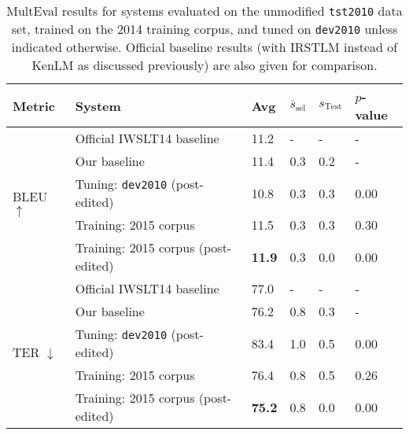 {%

















\begin{table}[htb]
\begin{center}
\begin{tabular}{|l|l|l|l|l|l|}
\hline
\bf Metric & \bf System & \bf Avg & \bf $\overline{s}_{\text{sel}}$ & \bf $s_{\text{Test}}$ & \bf $p$-value \\
\hline
\multirow{5}{*}{BLEU $\uparrow$}
& Official IWSLT14 baseline  & 11.2 & -   & -   & - \\
& Our baseline & 11.4 & 0.3 & 0.2 & - \\
& Tuning: {\small \tt dev2010} (post-edited) & 10.8 & 0.3 & 0.3 & 0.00 \\
& Training: 2015 corpus & 11.5 & 0.3 & 0.3 & 0.30 \\
& Training: 2015 corpus (post-edited) & \textbf{11.9} & 0.3 & 0.0 & 0.00 \\
\hline
\multirow{5}{*}{TER $\downarrow$}
& Official IWSLT14 baseline & 77.0 & -   & -   & - \\
& Our baseline & 76.2 & 0.8 & 0.3 & - \\
& Tuning: {\small \tt dev2010} (post-edited) & 83.4 & 1.0 & 0.5 & 0.00 \\
& Training: 2015 corpus & 76.4 & 0.8 & 0.5 & 0.26 \\
& Training: 2015 corpus (post-edited) & \textbf{75.2} & 0.8 & 0.0 & 0.00 \\
\hline
\end{tabular}
\end{center}

\caption{\label{tab:multeval_tst2010} %
MultEval results for systems evaluated on the unmodified {\small \tt tst2010} data set, trained on the 2014 training corpus, and tuned on {\small \tt dev2010} unless indicated otherwise.
Official baseline results (with IRSTLM instead of KenLM as discussed previously) are also given for comparison.
} %
\end{table}

}
